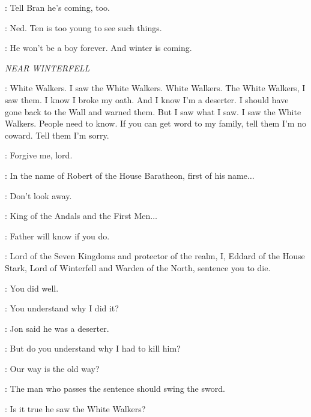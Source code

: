 \NED: Tell Bran he's coming, too. 


\CATELYN: Ned. Ten is too young to see such things. 

\NED: He won't be a boy forever. And winter is coming. 


\scene

\textit{NEAR WINTERFELL} 


\WILL: White Walkers. I saw the White Walkers. White Walkers. The White Walkers, I saw them. I know I broke my oath. And I know I'm a deserter. I should have gone back to the Wall and warned them. But I saw what I saw. I saw the White Walkers. People need to know. If you can get word to my family, tell them I'm no coward. Tell them I'm sorry. 


\WILL: Forgive me, lord. 

\NED: In the name of Robert of the House Baratheon, first of his name$\ldots$ 

\JON:  Don't look away. 

\NED: King of the Andals and the First Men$\ldots$ 

\JON: Father will know if you do. 

\NED: Lord of the Seven Kingdoms and protector of the realm, I, Eddard of the House Stark, Lord of Winterfell and Warden of the North, sentence you to die. 


\JON: You did well. 


\NED: You understand why I did it? 

\BRAN: Jon said he was a deserter. 

\NED: But do you understand why I had to kill him? 

\BRAN: Our way is the old way? 

\NED: The man who passes the sentence should swing the sword. 

\BRAN: Is it true he saw the White Walkers? 

